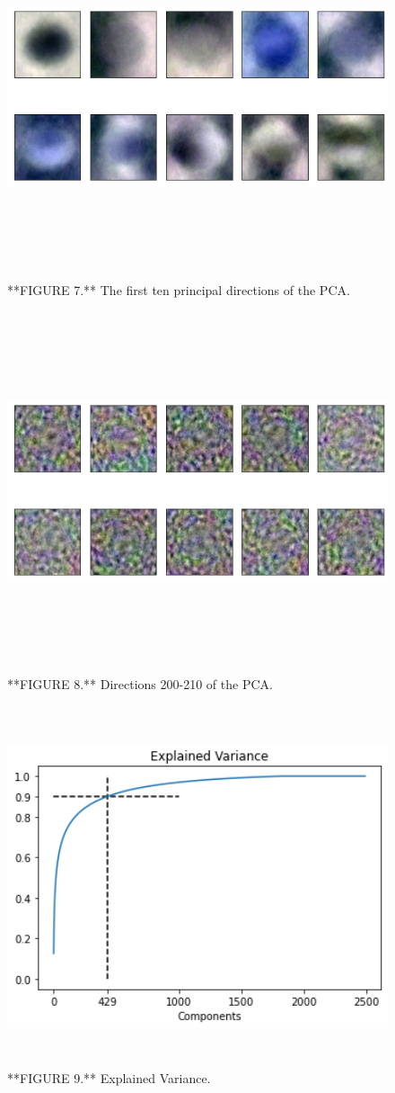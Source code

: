 \documentclass[]{article}
\begin{document}
\begin{figure}

{\centering \includegraphics[width=800px,height=400]{Images/PCA1} 

}

\caption{**FIGURE 7.** The first ten principal directions of the PCA.}\label{fig:pca1}
\end{figure}
\begin{figure}

{\centering \includegraphics[width=800px,height=400]{Images/PCA200} 

}

\caption{**FIGURE 8.** Directions 200-210 of the PCA.}\label{fig:pca200}
\end{figure}
\begin{figure}

{\centering \includegraphics[width=550px,height=400]{Images/ExplainedVariance90} 

}

\caption{**FIGURE 9.** Explained Variance.}\label{fig:variance}
\end{figure}
\end{document}
